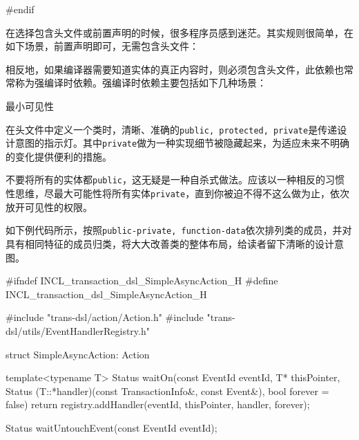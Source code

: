 \begin{content}
\begin{leftbar}
\begin{c++}
#endif
\end{c++}
\end{leftbar}

在选择包含头文件或前置声明的时候，很多程序员感到迷茫。其实规则很简单，在如下场景，前置声明即可，无需包含头文件：

\begin{enum}
\end{enum}

相反地，如果编译器需要知道实体的真正内容时，则必须包含头文件，此依赖也常常称为强编译时依赖。强编译时依赖主要包括如下几种场景：
\begin{enum}
\end{enum}

\begin{principle}
最小可见性
\end{principle}

在头文件中定义一个类时，清晰、准确的\texttt{public, protected, private}是传递设计意图的指示灯。其中\texttt{private}做为一种实现细节被隐藏起来，为适应未来不明确的变化提供便利的措施。

不要将所有的实体都\texttt{public}，这无疑是一种自杀式做法。应该以一种相反的习惯性思维，尽最大可能性将所有实体\texttt{private}，直到你被迫不得不这么做为止，依次放开可见性的权限。

如下例代码所示，按照\texttt{public-private, function-data}依次排列类的成员，并对具有相同特征的成员归类，将大大改善类的整体布局，给读者留下清晰的设计意图。

\begin{leftbar}
\begin{c++}
#ifndef INCL_transaction_dsl_SimpleAsyncAction_H
#define INCL_transaction_dsl_SimpleAsyncAction_H

#include "trans-dsl/action/Action.h"
#include "trans-dsl/utils/EventHandlerRegistry.h"

struct SimpleAsyncAction: Action
{
   template<typename T>
   Status waitOn(const EventId eventId, T* thisPointer,
            Status (T::*handler)(const TransactionInfo&, const Event&), 
            bool forever = false)
   {
      return registry.addHandler(eventId, thisPointer, handler, forever);
   }

   Status waitUntouchEvent(const EventId eventId);

}
\end{c++}
\end{leftbar}
\end{content}
